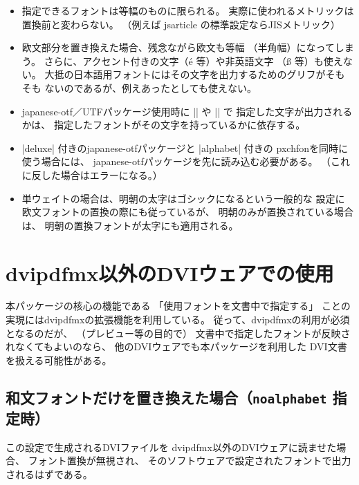 \documentclass[uplatex,dvipdfmx,a4paper]{jsarticle}
\newcommand{\Pkg}[1]{\textsf{#1}}
\begin{document}
\begin{itemize}
\item 指定できるフォントは等幅のものに限られる。
  実際に使われるメトリックは置換前と変わらない。
  （例えば jsarticle の標準設定ならJISメトリック）
\item 欧文部分を置き換えた場合、残念ながら欧文も等幅
  （半角幅）になってしまう。
  さらに、アクセント付きの文字（\'e 等）や非英語文字
  （{\ss} 等）も使えない。
  大抵の日本語用フォントにはその文字を出力するためのグリフがそもそも
  ないのであるが、例えあったとしても使えない。
\item \Pkg{japanese-otf}／\Pkg{UTF}パッケージ使用時に |\UTF| や |\CID| で
  指定した文字が出力されるかは、
  指定したフォントがその文字を持っているかに依存する。
\item |deluxe| 付きの\Pkg{japanese-otf}パッケージと |alphabet| 付きの
  \Pkg{pxchfon}を同時に使う場合には、
  \Pkg{japanese-otf}パッケージを先に読み込む必要がある。
  （これに反した場合はエラーになる。）
\item 単ウェイトの場合は、明朝の太字はゴシックになるという一般的な
  設定に欧文フォントの置換の際にも従っているが、
  明朝のみが置換されている場合は、
  明朝の置換フォントが太字にも適用される。
\end{itemize}

\appendix
\section{dvipdfmx以外のDVIウェアでの使用}
\label{sec:Other-Drivers}

本パッケージの核心の機能である
「使用フォントを文書中で指定する」
ことの実現にはdvipdfmxの拡張機能を利用している。
従って、dvipdfmxの利用が必須となるのだが、
（プレビュー等の目的で）
文書中で指定したフォントが反映されなくてもよいのなら、
他のDVIウェアでも本パッケージを利用した
DVI文書を扱える可能性がある。

\subsection{和文フォントだけを置き換えた場合（\texttt{noalphabet} 指定時）}

この設定で生成されるDVIファイルを
dvipdfmx以外のDVIウェアに読ませた場合、
フォント置換が無視され、
そのソフトウェアで設定されたフォントで出力されるはずである。
\end{document}
